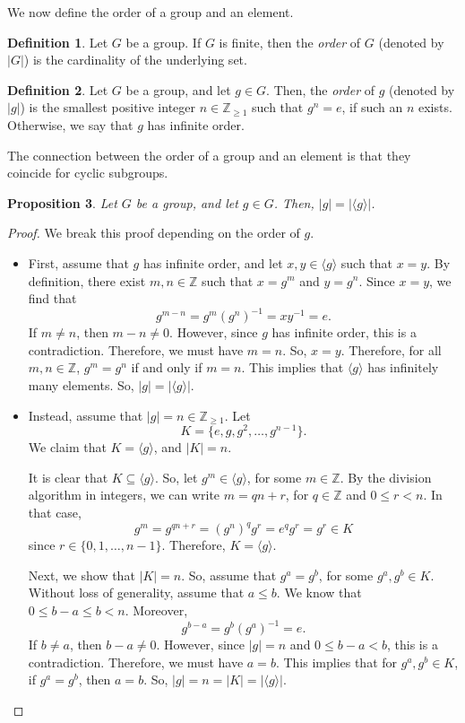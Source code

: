 \documentclass[a4paper, openany]{memoir}
\theoremstyle{definition}
\newtheorem{definition}{Definition}[section]
\theoremstyle{plain}
\newtheorem{proposition}[definition]{Proposition}
\begin{document}
We now define the order of a group and an element.
\begin{definition}
Let $G$ be a group. If $G$ is finite, then the \emph{order} of $G$ (denoted by $|G|$) is the cardinality of the underlying set.
\end{definition}
\begin{definition}
Let $G$ be a group, and let $g \in G$. Then, the \emph{order} of $g$ (denoted by $|g|$) is the smallest positive integer $n \in \mathbb{Z}_{\geqslant 1}$ such that $g^n = e$, if such an $n$ exists. Otherwise, we say that $g$ has infinite order.
\end{definition}
\noindent The connection between the order of a group and an element is that they coincide for cyclic subgroups.
\begin{proposition}
Let $G$ be a group, and let $g \in G$. Then, $|g| = |\langle g \rangle|$.
\end{proposition}
\begin{proof}
We break this proof depending on the order of $g$.
\begin{itemize}
    \item First, assume that $g$ has infinite order, and let $x, y \in \langle g \rangle$ such that $x = y$. By definition, there exist $m, n \in \mathbb{Z}$ such that $x = g^m$ and $y = g^n$. Since $x = y$, we find that
    \[g^{m-n} = g^m (g^n)^{-1} = xy^{-1} = e.\]
    If $m \neq n$, then $m-n \neq 0$. However, since $g$ has infinite order, this is a contradiction. Therefore, we must have $m = n$. So, $x = y$. Therefore, for all $m, n \in \mathbb{Z}$, $g^m = g^n$ if and only if $m = n$. This implies that $\langle g \rangle$ has infinitely many elements. So, $|g| = |\langle g \rangle|$.
    
    \item Instead, assume that $|g| = n \in \mathbb{Z}_{\geqslant 1}$. Let
    \[K = \{e, g, g^2, \dots, g^{n-1}\}.\]
    We claim that $K = \langle g \rangle$, and $|K| = n$.
    
    It is clear that $K \subseteq \langle g \rangle$. So, let $g^m \in \langle g \rangle$, for some $m \in \mathbb{Z}$. By the division algorithm in integers, we can write $m = qn + r$, for $q \in \mathbb{Z}$ and $0 \leqslant r < n$. In that case,
    \[g^m = g^{qn + r} = (g^n)^q g^r = e^q g^r = g^r \in K\]
    since $r \in \{0, 1, \dots, n-1\}$. Therefore, $K = \langle g \rangle$.
    
    Next, we show that $|K| = n$. So, assume that $g^a = g^b$, for some $g^a, g^b \in K$. Without loss of generality, assume that $a \leqslant b$. We know that $0 \leqslant b - a \leqslant b < n$. Moreover,
    \[g^{b-a} = g^b (g^a)^{-1} = e.\]
    If $b \neq a$, then $b-a \neq 0$. However, since $|g| = n$ and $0 \leqslant b-a < b$, this is a contradiction. Therefore, we must have $a = b$. This implies that for $g^a, g^b \in K$, if $g^a = g^b$, then $a = b$. So, $|g| = n = |K| = |\langle g \rangle|$.
\end{itemize}
\end{proof}
\end{document}
